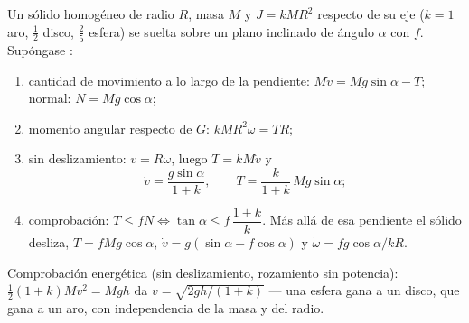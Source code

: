 \begin{method}\label{met:b2:rigid-body-mechanics:incline}
Un sólido homogéneo de radio $R$, masa $M$ y  $J =
kMR^2$ respecto de su eje ($k = 1$ aro, $\tfrac12$ disco, $\tfrac25$ esfera)
se suelta sobre un plano inclinado de ángulo $\alpha$ con  $f$. Supóngase :
\begin{enumerate}
  \item cantidad de movimiento a lo largo de la pendiente:
        $M\dot v = Mg\sin\alpha - T$; normal: $N = Mg\cos\alpha$;
  \item momento angular respecto de $G$: $kMR^2\dot\omega = TR$;
  \item sin deslizamiento: $v = R\omega$, luego $T = kM\dot v$ y
        \[
        \dot v = \frac{g\sin\alpha}{1 + k} , \qquad T = \frac{k}{1 + k}\,
        Mg\sin\alpha ;
        \]
  \item comprobación: $T \le fN \iff \tan\alpha \le f\,\dfrac{1 + k}{k}$.
        Más allá de esa pendiente el sólido desliza, $T = fMg\cos\alpha$, $\dot v =
        g(\sin\alpha - f\cos\alpha)$ y $\dot\omega = fg\cos\alpha/kR$.
\end{enumerate}
Comprobación energética (sin deslizamiento, rozamiento sin potencia): $\tfrac12(1 + k)Mv^2 =
Mgh$ da $v = \sqrt{2gh/(1 + k)}$ --- una esfera gana a un disco, que gana a
un aro, con independencia de la masa y del radio.
\end{method}

